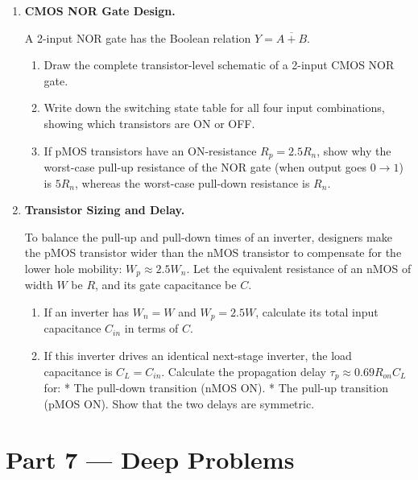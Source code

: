 \documentclass[12pt, a4paper]{book}
\begin{document}
\begin{problembox}
\begin{enumerate}[label=\textbf{P\arabic*.}]
  \item \textbf{CMOS NOR Gate Design.}
  
        A 2-input NOR gate has the Boolean relation $Y = \overline{A + B}$.
        \begin{enumerate}[label=(\alph*)]
          \item Draw the complete transistor-level schematic of a 2-input CMOS NOR gate.
          \item Write down the switching state table for all four input combinations, showing which transistors are ON or OFF.
          \item If pMOS transistors have an ON-resistance $R_p = 2.5 R_n$, show why the worst-case pull-up resistance of the NOR gate (when output goes $0 \to 1$) is $5 R_n$, whereas the worst-case pull-down resistance is $R_n$.
        \end{enumerate}

  \item \textbf{Transistor Sizing and Delay.}
  
        To balance the pull-up and pull-down times of an inverter, designers make the pMOS transistor wider than the nMOS transistor to compensate for the lower hole mobility: $W_p \approx 2.5 W_n$.
        Let the equivalent resistance of an nMOS of width $W$ be $R$, and its gate capacitance be $C$.
        \begin{enumerate}[label=(\alph*)]
          \item If an inverter has $W_n = W$ and $W_p = 2.5 W$, calculate its total input capacitance $C_{in}$ in terms of $C$.
          \item If this inverter drives an identical next-stage inverter, the load capacitance is $C_L = C_{in}$.
                Calculate the propagation delay $\tau_p \approx 0.69 R_{on} C_L$ for:
                * The pull-down transition (nMOS ON).
                * The pull-up transition (pMOS ON).
                Show that the two delays are symmetric.
        \end{enumerate}
\end{enumerate}
\end{problembox}

\newpage

\section{Part 7 --- Deep Problems}
\end{document}
